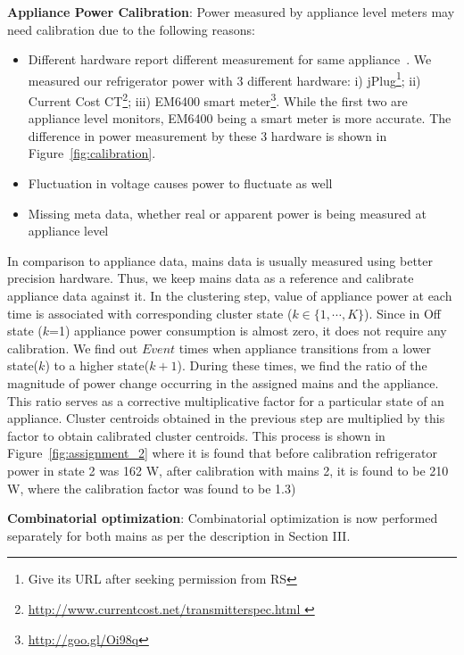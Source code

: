 \documentclass[conference]{IEEEtran}
\newcommand{\figref}[1]{Figure~\ref{#1}}
\begin{document}
\noindent\textbf{Appliance Power Calibration}: 
Power measured by appliance level meters may need calibration due to the following reasons:
\begin{itemize}
\item Different hardware report different measurement for same appliance~\cite{berges2008}. We measured our refrigerator power with 3 different hardware: i) jPlug\footnote{Give its URL after seeking permission from RS}; ii) Current Cost CT\footnote{\url{http://www.currentcost.net/transmitterspec.html
}}; iii) EM6400 smart meter\footnote{\url{http://goo.gl/Oi98q}}. While the first two are appliance level monitors, EM6400 being a smart meter is more accurate. The difference in power measurement by these 3 hardware is shown in \figref{fig:calibration}.
\item Fluctuation in voltage causes power to fluctuate as well~\cite{hart}
\item Missing meta data, whether real or apparent power is being measured at appliance level

\end{itemize} In comparison to appliance data, mains data is usually measured using better precision hardware. Thus, we keep mains data as a reference and calibrate appliance data against it. In the clustering step, value of appliance power at each time is associated with corresponding cluster state ($k \in \{1,\cdots,K\}$). Since in Off state ($k$=1) appliance power consumption is almost zero, it does not require any calibration. We find out $Event$ times when appliance transitions from a lower state($k$) to a higher state($k+1$). During these times, we find the ratio of the magnitude of power change occurring in the assigned mains and the appliance. This ratio serves as a corrective multiplicative factor for a particular  state of an appliance. Cluster centroids obtained in the previous step are multiplied by this factor to obtain calibrated cluster centroids.
This process is shown in \figref{fig:assignment_2} where it is found that before calibration refrigerator power in state 2 was 162 W, after calibration with mains 2, it is found to be 210 W, where the calibration factor was found to be 1.3)

\noindent\textbf{Combinatorial optimization}: Combinatorial optimization is now performed separately for both mains as per the description in Section III.
\end{document}
